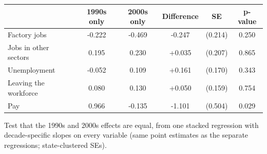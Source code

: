 \begin{tabular}{lccccc}
\toprule
 & 1990s only & 2000s only & Difference & SE & p-value \\
\midrule
Factory jobs & -0.222 & -0.469 & -0.247 & (0.214) & 0.250 \\
Jobs in other sectors & 0.195 & 0.230 & +0.035 & (0.207) & 0.865 \\
Unemployment & -0.052 & 0.109 & +0.161 & (0.170) & 0.343 \\
Leaving the workforce & 0.080 & 0.130 & +0.050 & (0.159) & 0.754 \\
Pay & 0.966 & -0.135 & -1.101 & (0.504) & 0.029 \\
\bottomrule
\end{tabular}

{\tiny Test that the 1990s and 2000s effects are equal, from one stacked regression with decade-specific slopes on every variable (same point estimates as the separate regressions; state-clustered SEs).}
